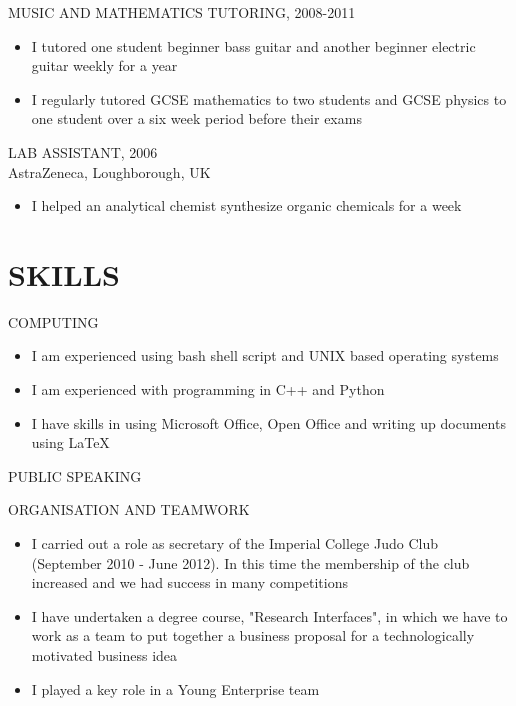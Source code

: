 \documentclass[9pt]{res} %
\begin{document}
\begin{resume}
MUSIC AND MATHEMATICS TUTORING, 2008-2011
\vspace{0.1cm}
 \begin{itemize}
   \item I tutored one student beginner bass guitar and another beginner electric guitar weekly for a year
   \item I regularly tutored GCSE mathematics to two students and GCSE physics to one student over a six week period before their exams
 \end{itemize}

LAB ASSISTANT, 2006 \\
\vspace{0.1cm}
AstraZeneca, Loughborough, UK
 \begin{itemize} \itemsep -2pt
   \item I helped an analytical chemist synthesize organic chemicals for a week
 \end{itemize} 

\section{SKILLS}
\vspace{0.2cm}

COMPUTING
\vspace{0.1cm}
 \begin{itemize}
   \item I am experienced using bash shell script and UNIX based operating systems
   \item I am experienced with programming in C++ and Python
   \item I have skills in using Microsoft Office, Open Office and writing up documents using LaTeX
 \end{itemize}

PUBLIC SPEAKING
\vspace{0.1cm}

ORGANISATION AND TEAMWORK
\vspace{0.1cm}
\begin{itemize}
   \item I carried out a role as secretary of the Imperial College Judo Club (September 2010 - June 2012). In this time the membership of the club increased and we had success in many competitions
   \item I have undertaken a degree course, "Research Interfaces", in which we have to work as a team to put together a business proposal for a technologically motivated business idea
   \item I played a key role in a Young Enterprise team
\end{itemize}


\end{resume}
\end{document}

